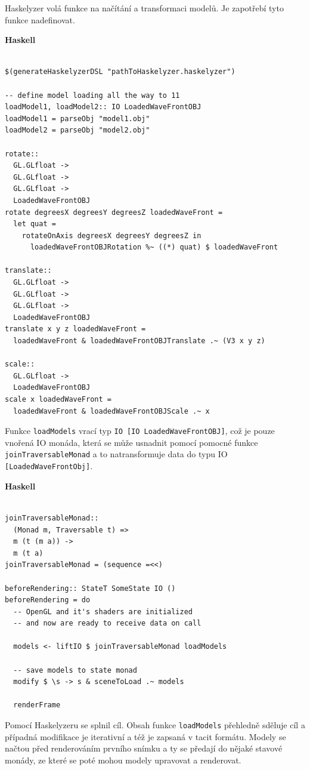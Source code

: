 \documentclass[male,czech]{kithesis}
\newcommand{\haskellInline}[1]{\colorbox{gray!10}{\texttt{#1}}}
\begin{document}
Haskelyzer volá funkce na načítání a transformaci modelů.
Je zapotřebí tyto funkce nadefinovat.

\textbf{Haskell}
\begin{verbatim}

$(generateHaskelyzerDSL "pathToHaskelyzer.haskelyzer")

-- define model loading all the way to 11
loadModel1, loadModel2:: IO LoadedWaveFrontOBJ
loadModel1 = parseObj "model1.obj"
loadModel2 = parseObj "model2.obj"

rotate:: 
  GL.GLfloat -> 
  GL.GLfloat -> 
  GL.GLfloat -> 
  LoadedWaveFrontOBJ
rotate degreesX degreesY degreesZ loadedWaveFront = 
  let quat = 
    rotateOnAxis degreesX degreesY degreesZ in 
      loadedWaveFrontOBJRotation %~ ((*) quat) $ loadedWaveFront 

translate:: 
  GL.GLfloat -> 
  GL.GLfloat -> 
  GL.GLfloat -> 
  LoadedWaveFrontOBJ
translate x y z loadedWaveFront = 
  loadedWaveFront & loadedWaveFrontOBJTranslate .~ (V3 x y z)
      
scale:: 
  GL.GLfloat -> 
  LoadedWaveFrontOBJ
scale x loadedWaveFront = 
  loadedWaveFront & loadedWaveFrontOBJScale .~ x

\end{verbatim}

Funkce \haskellInline{loadModels} vrací typ \haskellInline{IO [IO LoadedWaveFrontOBJ]},
což je pouze vnořená IO monáda, 
která se může usnadnit pomocí pomocné funkce \haskellInline{joinTraversableMonad} a 
to natransformuje data do typu IO \haskellInline{[LoadedWaveFrontObj]}.

\textbf{Haskell}
\begin{verbatim}

joinTraversableMonad:: 
  (Monad m, Traversable t) => 
  m (t (m a)) -> 
  m (t a)
joinTraversableMonad = (sequence =<<)

beforeRendering:: StateT SomeState IO ()
beforeRendering = do
  -- OpenGL and it's shaders are initialized 
  -- and now are ready to receive data on call

  models <- liftIO $ joinTraversableMonad loadModels 

  -- save models to state monad
  modify $ \s -> s & sceneToLoad .~ models

  renderFrame

\end{verbatim}

Pomocí Haskelyzeru se splnil cíl.
Obsah funkce \haskellInline{loadModels} přehledně sděluje cíl a 
případná modifikace je iterativní a 
též je zapsaná v tacit formátu.
Modely se načtou před renderováním prvního snímku a 
ty se předají do nějaké stavové monády, 
ze které se poté mohou modely upravovat a renderovat.
\end{document}
